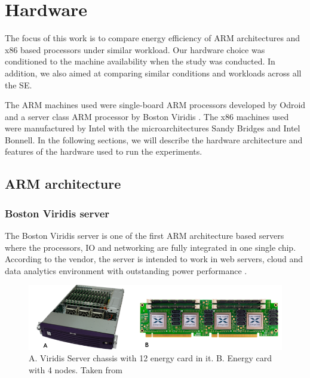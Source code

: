 \section{Hardware}
The focus of this work is to compare energy efficiency of ARM architectures and x86 based 
processors under similar workload. Our hardware choice  was conditioned to the
machine availability when the study was conducted. In addition, we also aimed
at comparing similar conditions and workloads across all the SE. 


The ARM machines used were single-board ARM processors developed by Odroid
\cite{ODROID_XU3} and a server class ARM processor by Boston 
Viridis \cite{VIRIDIS}. The x86 machines used were manufactured by Intel with
the microarchitectures Sandy Bridges and Intel Bonnell. In the following
sections, we will describe the hardware architecture and features of the
hardware used to run the experiments.

\subsection{ARM architecture}
\subsubsection{Boston Viridis server}

The Boston Viridis server is one of the first ARM architecture based servers
where the processors, IO and networking are fully integrated in one single chip.
According to the vendor, the server is intended to work in web servers,
cloud and data analytics environment with outstanding power performance
\cite{VIRIDIS}.

\vspace{15mm}

\begin{figure}[h!]
  \centering
    \includegraphics[width=\textwidth]{"img/viridis&SoC"}
    \caption{A. Viridis Server chassis with 12 energy card in it. B. Energy card
with 4 nodes. Taken from \cite{VIRIDIS}}
    \label{fig:viridis&SoC}
\end{figure}

